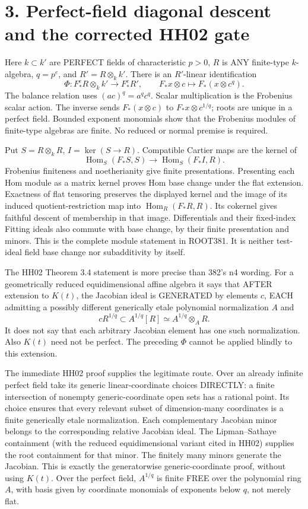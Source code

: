 \documentclass[11pt]{article}
\begin{document}
\section{3. Perfect-field diagonal descent and the corrected HH02 gate}

Here \(k\subset k'\) are PERFECT fields of characteristic \(p>0\), \(R\) is ANY finite-type \(k\)-algebra, \(q=p^e\), and \(R'=R\otimes_k k'\). There is an \(R'\)-linear identification
\[
\Phi:F_*^eR\otimes_k k'\longrightarrow F_*^eR',\qquad
F_*x\otimes c\longmapsto F_*(x\otimes c^q).
\]
The balance relation uses \((ac)^q=a^qc^q\). Scalar multiplication is the Frobenius scalar action. The inverse sends \(F_*(x\otimes c)\) to \(F_*x\otimes c^{1/q}\); roots are unique in a perfect field. Bounded exponent monomials show that the Frobenius modules of finite-type algebras are finite. No reduced or normal premise is required.

Put \(S=R\otimes_kR\), \(I=\ker(S\to R)\). Compatible Cartier maps are the kernel of
\[
\operatorname{Hom}_S(F_*S,S)\longrightarrow\operatorname{Hom}_S(F_*I,R).
\]
Frobenius finiteness and noetherianity give finite presentations. Presenting each Hom module as a matrix kernel proves Hom base change under the flat extension. Exactness of flat tensoring preserves the displayed kernel and the image of its induced quotient-restriction map into \(\operatorname{Hom}_R(F_*R,R)\). Its cokernel gives faithful descent of membership in that image. Differentials and their fixed-index Fitting ideals also commute with base change, by their finite presentation and minors. This is the complete module statement in ROOT381. It is neither test-ideal field base change nor subadditivity by itself.

The HH02 Theorem 3.4 statement is more precise than 382's n4 wording. For a geometrically reduced equidimensional affine algebra it says that AFTER extension to \(K(t)\), the Jacobian ideal is GENERATED by elements \(c\), EACH admitting a possibly different generically etale polynomial normalization \(A\) and
\[
cR^{1/q}\subset A^{1/q}[R]\simeq A^{1/q}\otimes_A R.
\]
It does not say that each arbitrary Jacobian element has one such normalization. Also \(K(t)\) need not be perfect. The preceding \(\Phi\) cannot be applied blindly to this extension.

The immediate HH02 proof supplies the legitimate route. Over an already infinite perfect field take its generic linear-coordinate choices DIRECTLY: a finite intersection of nonempty generic-coordinate open sets has a rational point. Its choice ensures that every relevant subset of dimension-many coordinates is a finite generically etale normalization. Each complementary Jacobian minor belongs to the corresponding relative Jacobian ideal. The Lipman--Sathaye containment (with the reduced equidimensional variant cited in HH02) supplies the root containment for that minor. The finitely many minors generate the Jacobian. This is exactly the generatorwise generic-coordinate proof, without using \(K(t)\). Over the perfect field, \(A^{1/q}\) is finite FREE over the polynomial ring \(A\), with basis given by coordinate monomials of exponents below \(q\), not merely flat.
\end{document}
